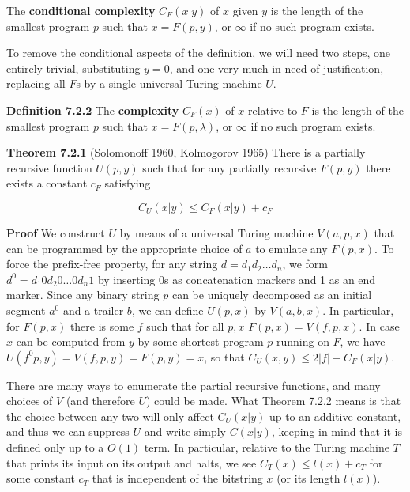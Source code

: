 \smallskip{} The {\bf conditional complexity}
$C_F(x|y)$ of $x$ given $y$ is the length of the smallest program $p$
such that $x=F(p,y)$, or $\infty$ if no such program exists.

\smallskip\noindent
To remove the conditional aspects of the definition, we will need two
steps, one entirely trivial, substituting $y=0$, and one very much in need of
justification, replacing all $F$s by a single universal Turing machine $U$.

\smallskip\noindent
{\bf Definition 7.2.2} The {\bf complexity} $C_F(x)$ of $x$ relative to $F$
is the length of the smallest program $p$ such that $x=F(p,\lambda)$, or
$\infty$ if no such program exists.

\smallskip\noindent
{\bf Theorem 7.2.1} (Solomonoff 1960, Kolmogorov 1965) There is a partially 
recursive function $U(p,y)$ such that for any partially recursive $F(p,y)$ 
there exists a constant $c_F$ satisfying\nocite{Solomonoff:1960}
\nocite{Kolmogorov:1965}

\begin{equation}
C_U(x|y) \leq C_F(x|y) + c_F
\end{equation}

\smallskip\noindent
{\bf Proof} We construct $U$ by means of a universal Turing machine
$V(a,p,x)$ that can be programmed by the appropriate choice of $a$ to emulate
any $F(p,x)$. To force the prefix-free property, for any string $d=d_1 d_2
\ldots d_n$, we form $d^0=d_1 0 d_2 0 \ldots 0 d_n 1$ by inserting 0s as
concatenation markers and 1 as an end marker. Since any binary string $p$
can be uniquely decomposed as an initial segment $a^0$ and a trailer $b$, 
we can define $U(p,x)$ by $V(a,b,x)$. In particular, for $F(p,x)$ there is
some $f$ such that for all $p,x$ $F(p,x)=V(f,p,x)$. In case $x$ can be 
computed from $y$ by some shortest program $p$ running on $F$, we have 
$U(f^0p,y)=V(f,p,y)=F(p,y)=x$, so that $C_U(x,y) \leq 2|f| + C_F(x|y)$.

\smallskip{} There are many ways to enumerate the
partial recursive functions, and many choices of $V$ (and therefore $U$) could
be made. What Theorem 7.2.2 means is that the choice between any two will only
affect $C_U(x|y)$ up to an additive constant, and thus we can suppress $U$ and
write simply $C(x|y)$, keeping in mind that it is defined only up to a $O(1)$
term. In particular, relative to the Turing machine $T$ that prints its input 
on its output and halts, we see $C_T(x) \leq l(x) + c_T$ for some constant
$c_T$ that is independent of the bitstring $x$ (or its length $l(x)$). 

